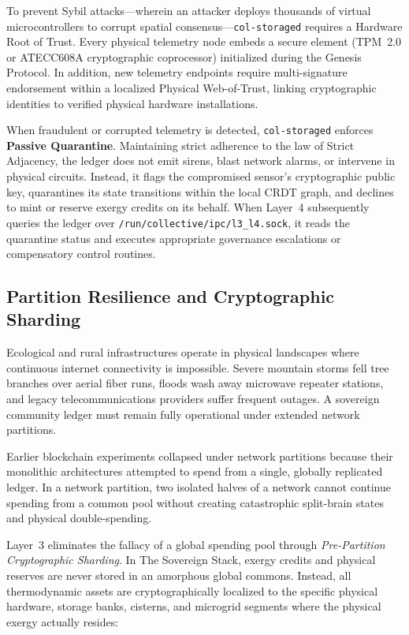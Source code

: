 To prevent Sybil attacks---wherein an attacker deploys thousands of virtual microcontrollers to corrupt spatial consensus---\texttt{col-storaged} requires a Hardware Root of Trust. Every physical telemetry node embeds a secure element (TPM~2.0 or ATECC608A cryptographic coprocessor) initialized during the Genesis Protocol. In addition, new telemetry endpoints require multi-signature endorsement within a localized Physical Web-of-Trust, linking cryptographic identities to verified physical hardware installations.

When fraudulent or corrupted telemetry is detected, \texttt{col-storaged} enforces \textbf{Passive Quarantine}. Maintaining strict adherence to the law of Strict Adjacency, the ledger does not emit sirens, blast network alarms, or intervene in physical circuits. Instead, it flags the compromised sensor's cryptographic public key, quarantines its state transitions within the local CRDT graph, and declines to mint or reserve exergy credits on its behalf. When Layer~4 subsequently queries the ledger over \texttt{/run/collective/ipc/l3\_l4.sock}, it reads the quarantine status and executes appropriate governance escalations or compensatory control routines.

\subsection{Partition Resilience and Cryptographic Sharding}

Ecological and rural infrastructures operate in physical landscapes where continuous internet connectivity is impossible. Severe mountain storms fell tree branches over aerial fiber runs, floods wash away microwave repeater stations, and legacy telecommunications providers suffer frequent outages. A sovereign community ledger must remain fully operational under extended network partitions.

Earlier blockchain experiments collapsed under network partitions because their monolithic architectures attempted to spend from a single, globally replicated ledger. In a network partition, two isolated halves of a network cannot continue spending from a common pool without creating catastrophic split-brain states and physical double-spending.

Layer~3 eliminates the fallacy of a global spending pool through \textit{Pre-Partition Cryptographic Sharding}. In The Sovereign Stack, exergy credits and physical reserves are never stored in an amorphous global commons. Instead, all thermodynamic assets are cryptographically localized to the specific physical hardware, storage banks, cisterns, and microgrid segments where the physical exergy actually resides:

